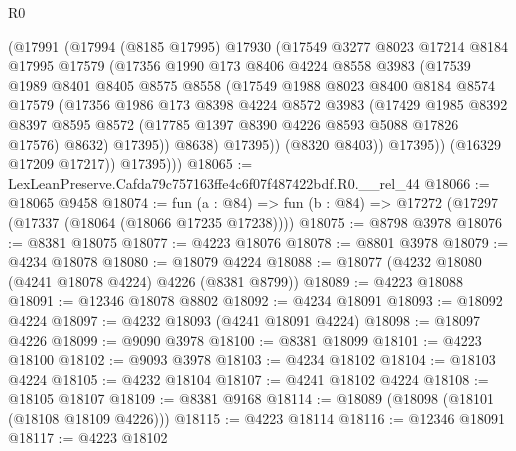 \begin{lexlean}{R0}
\begin{coremodule}
              (@17991
                (@17994
                  (@8185 @17995)
                  @17930
                  (@17549
                    @3277
                    @8023
                    @17214
                    @8184
                    @17995
                    @17579
                    (@17356
                      @1990
                      @173
                      @8406
                      @4224
                      @8558
                      @3983
                      (@17539
                        @1989
                        @8401
                        @8405
                        @8575
                        @8558
                        (@17549
                          @1988
                          @8023
                          @8400
                          @8184
                          @8574
                          @17579
                          (@17356
                            @1986
                            @173
                            @8398
                            @4224
                            @8572
                            @3983
                            (@17429
                              @1985
                              @8392
                              @8397
                              @8595
                              @8572
                              (@17785 @1397 @8390 @4226 @8593 @5088 @17826 @17576)
                              @8632)
                            @17395))
                        @8638)
                      @17395))
                  (@8320 @8403))
                @17395))
            (@16329 @17209 @17217))
          @17395)))
@18065 := LexLeanPreserve.Cafda79c757163ffe4c6f07f487422bdf.R0.__rel_44
@18066 := @18065 @9458
@18074 := fun (a : @84) => fun (b : @84) => @17272 (@17297 (@17337 (@18064 (@18066 @17235 @17238))))
@18075 := @8798 @3978
@18076 := @8381 @18075
@18077 := @4223 @18076
@18078 := @8801 @3978
@18079 := @4234 @18078
@18080 := @18079 @4224
@18088 := @18077 (@4232 @18080 (@4241 @18078 @4224) @4226 (@8381 @8799))
@18089 := @4223 @18088
@18091 := @12346 @18078 @8802
@18092 := @4234 @18091
@18093 := @18092 @4224
@18097 := @4232 @18093 (@4241 @18091 @4224)
@18098 := @18097 @4226
@18099 := @9090 @3978
@18100 := @8381 @18099
@18101 := @4223 @18100
@18102 := @9093 @3978
@18103 := @4234 @18102
@18104 := @18103 @4224
@18105 := @4232 @18104
@18107 := @4241 @18102 @4224
@18108 := @18105 @18107
@18109 := @8381 @9168
@18114 := @18089 (@18098 (@18101 (@18108 @18109 @4226)))
@18115 := @4223 @18114
@18116 := @12346 @18091
@18117 := @4223 @18102

\end{coremodule}
\end{lexlean}
